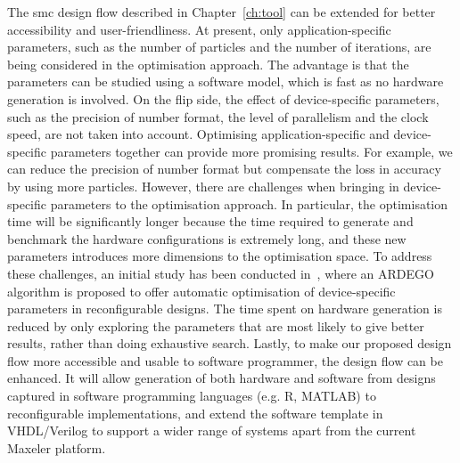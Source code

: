 The \gls{smc} design flow described in Chapter~\ref{ch:tool} can be extended for better accessibility and user-friendliness.
At present, only application-specific parameters, such as the number of particles and the number of iterations, are being considered in the optimisation approach.
The advantage is that the parameters can be studied using a software model, which is fast as no hardware generation is involved.
On the flip side, the effect of device-specific parameters, such as the precision of number format, the level of parallelism and the clock speed, are not taken into account.
Optimising application-specific and device-specific parameters together can provide more promising results.
For example, we can reduce the precision of number format but compensate the loss in accuracy by using more particles.
However, there are challenges when bringing in device-specific parameters to the optimisation approach.
In particular, the optimisation time will be significantly longer because the time required to generate and benchmark the hardware configurations is extremely long, and these new parameters introduces more dimensions to the optimisation space.
To address these challenges, an initial study has been conducted in~\cite{kurek14fccm}, where an ARDEGO algorithm is proposed to offer automatic optimisation of device-specific parameters in reconfigurable designs.
The time spent on hardware generation is reduced by only exploring the parameters that are most likely to give better results, rather than doing exhaustive search.
Lastly, to make our proposed design flow more accessible and usable to software programmer, the design flow can be enhanced.
It will allow generation of both hardware and software from designs captured in software programming languages (e.g. R, MATLAB) to reconfigurable implementations,
and extend the software template in VHDL/Verilog to support a wider range of systems apart from the current Maxeler platform.


